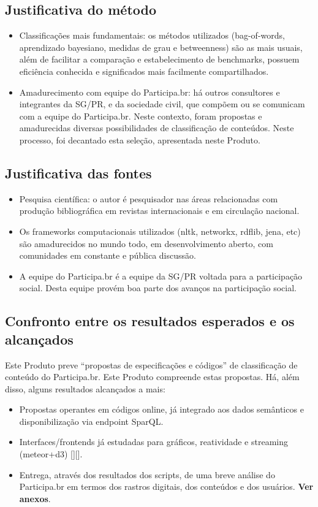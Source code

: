 \documentclass[12pt]{article}
\begin{document}
\subsection{Justificativa do método}
\begin{itemize}
    \item Classificações mais fundamentais: os métodos utilizados (bag-of-words, aprendizado bayesiano, medidas de grau e betweenness) são as mais usuais, além de facilitar a comparação e estabelecimento de benchmarks, possuem eficiência conhecida e significados mais facilmente compartilhados.
    \item Amadurecimento com equipe do Participa.br: há outros consultores e integrantes da SG/PR, e da sociedade civil, que compõem ou se comunicam com a equipe do Participa.br. Neste contexto, foram propostas e amadurecidas diversas possibilidades de classificação de conteúdos. Neste processo, foi decantado esta seleção, apresentada neste Produto.
\end{itemize}
\subsection{Justificativa das fontes}
\begin{itemize}
    \item Pesquisa científica: o autor é pesquisador nas áreas relacionadas com produção bibliográfica em revistas internacionais e em circulação nacional.
    \item Os frameworks computacionais utilizados (nltk, networkx, rdflib, jena, etc) são amadurecidos no mundo todo, em desenvolvimento aberto, com comunidades em constante e pública discussão.
    \item A equipe do Participa.br é a equipe da SG/PR voltada para a participação social. Desta equipe provém boa parte dos avanços na participação social.
\end{itemize}
\subsection{Confronto entre os resultados esperados e os alcançados}
Este Produto preve “propostas de especificações e códigos” de classificação de conteúdo do Participa.br. Este Produto compreende estas propostas. Há, além disso, alguns resultados alcançados a mais:
\begin{itemize}
    \item Propostas operantes em códigos online, já integrado aos dados semânticos e disponibilização via endpoint SparQL.
    \item Interfaces/frontends já estudadas para gráficos, reatividade e streaming (meteor+d3) [][].
    \item Entrega, através dos resultados dos scripts, de uma breve análise do Participa.br em termos dos rastros digitais, dos conteúdos e dos usuários. {\bf Ver anexos}.
\end{itemize}
\end{document}
